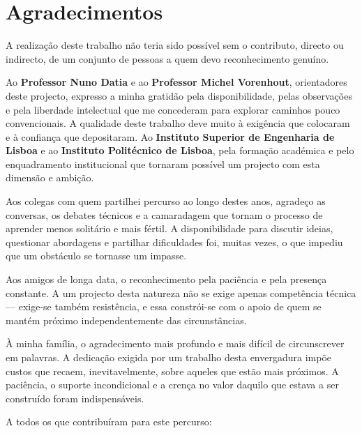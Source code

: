 %
%
\chapter*{Agradecimentos}
\label{cha:agradecimentos}
\enlargethispage{2.5cm}
{\setlength{\parskip}{3pt}

A realização deste trabalho não teria sido possível sem o contributo, directo ou indirecto, de um conjunto de pessoas a quem devo reconhecimento genuíno.

Ao \textbf{Professor Nuno Datia} e ao \textbf{Professor Michel Vorenhout}, orientadores deste projecto, expresso a minha gratidão pela disponibilidade, pelas observações e pela liberdade intelectual que me concederam para explorar caminhos pouco convencionais. A qualidade deste trabalho deve muito à exigência que colocaram e à confiança que depositaram. Ao \textbf{Instituto Superior de Engenharia de Lisboa} e ao \textbf{Instituto Politécnico de Lisboa}, pela formação académica e pelo enquadramento institucional que tornaram possível um projecto com esta dimensão e ambição.

Aos colegas com quem partilhei percurso ao longo destes anos, agradeço as conversas, os debates técnicos e a camaradagem que tornam o processo de aprender menos solitário e mais fértil. A disponibilidade para discutir ideias, questionar abordagens e partilhar dificuldades foi, muitas vezes, o que impediu que um obstáculo se tornasse um impasse.

Aos amigos de longa data, o reconhecimento pela paciência e pela presença constante. A um projecto desta natureza não se exige apenas competência técnica --- exige-se também resistência, e essa constrói-se com o apoio de quem se mantém próximo independentemente das circunstâncias.

À minha família, o agradecimento mais profundo e mais difícil de circunscrever em palavras. A dedicação exigida por um trabalho desta envergadura impõe custos que recaem, inevitavelmente, sobre aqueles que estão mais próximos. A paciência, o suporte incondicional e a crença no valor daquilo que estava a ser construído foram indispensáveis.

\vspace{0.5cm}

\noindent A todos os que contribuíram para este percurso:

\vspace{0.2cm}

}
